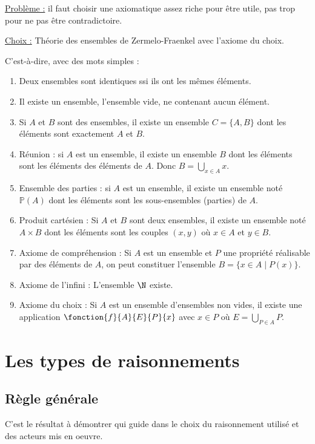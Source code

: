 \uline{Problème :} il faut choisir une axiomatique assez riche pour être utile, 
pas trop pour ne pas être contradictoire. 

\uline{Choix :} Théorie des ensembles de Zermelo-Fraenkel avec l'axiome du choix.

C'est-à-dire, avec des mots simples : 

\begin{enumerate}
    \item Deux ensembles sont identiques ssi ils ont les mêmes éléments. 
    \item Il existe un ensemble, l'ensemble vide, ne contenant aucun élément.
    \item Si $A$ et $B$ sont des ensembles, il existe un ensemble $C = \{A, B\}$
            dont les éléments sont exactement $A$ et $B$.
    \item Réunion : si $A$ est un ensemble, il existe un ensemble $B$ dont les éléments
        sont les éléments des éléments de $A$. Donc $B = \bigcup_{x \in A} x$.
    \item Ensemble des parties : si $A$ est un ensemble, il existe un ensemble noté
        $\mathbb P(A)$ dont les éléments sont les sous-ensembles (parties) de $A$.
    \item Produit cartésien : Si $A$ et $B$ sont deux ensembles, il existe un ensemble
        noté $A \times B$ dont les éléments sont les couples $(x, y)$ où $x \in A$ 
        et $y \in B$.
    \item Axiome de compréhension : Si $A$ est un ensemble et $P$ une propriété réalisable
        par des éléments de $A$, on peut constituer l'ensemble $B = \{x \in A \mid P(x)\}$.
    \item Axiome de l'infini : L'ensemble $\N$ existe.
    \item Axiome du choix : Si $A$ est un ensemble d'ensembles non vides, il existe une 
        application $\fonction{f}{A}{E}{P}{x}$ avec $x \in P$ où $E = \bigcup_{P \in A} P$.
\end{enumerate}

\section{Les types de raisonnements}

\subsection{Règle générale}

C'est le résultat à démontrer qui guide dans le choix du raisonnement utilisé et des
acteurs mis en oeuvre. 

